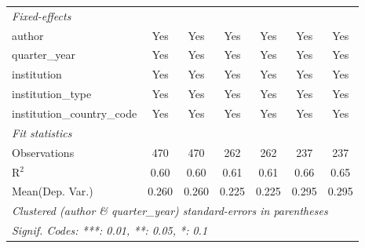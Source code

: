 \begin{tabular}{lcccccc}
   \midrule
   \emph{Fixed-effects}\\
   author                                   & Yes     & Yes            & Yes     & Yes     & Yes         & Yes\\  
   quarter\_year                            & Yes     & Yes            & Yes     & Yes     & Yes         & Yes\\  
   institution                              & Yes     & Yes            & Yes     & Yes     & Yes         & Yes\\  
   institution\_type                        & Yes     & Yes            & Yes     & Yes     & Yes         & Yes\\  
   institution\_country\_code               & Yes     & Yes            & Yes     & Yes     & Yes         & Yes\\  
   \midrule
   \emph{Fit statistics}\\
   Observations                             & 470     & 470            & 262     & 262     & 237         & 237\\  
   R$^2$                                    & 0.60    & 0.60           & 0.61    & 0.61    & 0.66        & 0.65\\  
Mean(Dep. Var.) & 0.260 & 0.260 & 0.225 & 0.225 & 0.295 & 0.295 \\
   \midrule \midrule
   \multicolumn{7}{l}{\emph{Clustered (author \& quarter\_year) standard-errors in parentheses}}\\
   \multicolumn{7}{l}{\emph{Signif. Codes: ***: 0.01, **: 0.05, *: 0.1}}\\
\end{tabular}
\par\endgroup
